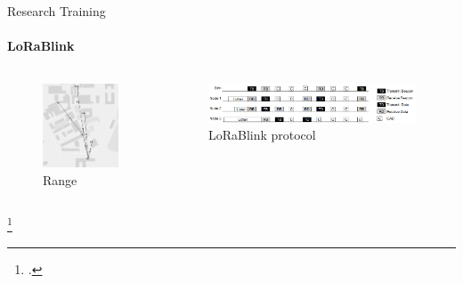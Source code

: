 \begin{frame}{Research Training}
\framesubtitle{LoRaBlink}
\begin{columns}
\begin{column}{0.3\textwidth}
\begin{figure}[H]
    \centering
    \includegraphics[width=1\textwidth]{presentation.tex/fig/lorablink2.png}
    \caption{Range\footnotemark}
\end{figure}
\end{column}
\begin{column}{0.7\textwidth}
\begin{figure}[H]
    \centering
    \includegraphics[width=0.98\textwidth]{presentation.tex/fig/lorablink.png}
    \caption{LoRaBlink protocol\footnotemark}
\end{figure}
\end{column}
\end{columns}
\footcitetext{lorablink}
\end{frame}

